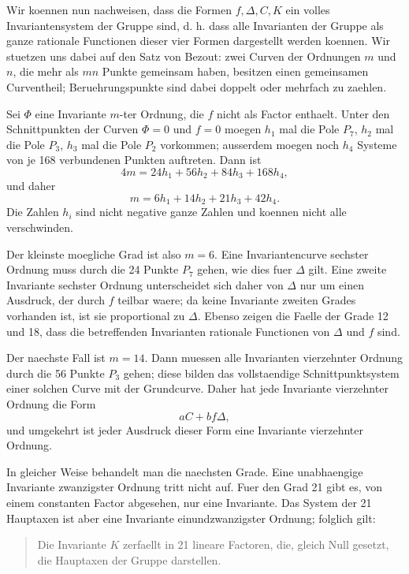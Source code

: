 \documentclass[11pt]{article}
\begin{document}
Wir koennen nun nachweisen, dass die Formen \(f,\Delta,C,K\) ein volles Invariantensystem der Gruppe sind, d. h. dass alle Invarianten der Gruppe als ganze rationale Functionen dieser vier Formen dargestellt werden koennen. Wir stuetzen uns dabei auf den Satz von Bezout: zwei Curven der Ordnungen \(m\) und \(n\), die mehr als \(mn\) Punkte gemeinsam haben, besitzen einen gemeinsamen Curventheil; Beruehrungspunkte sind dabei doppelt oder mehrfach zu zaehlen.

Sei \(\Phi\) eine Invariante \(m\)-ter Ordnung, die \(f\) nicht als Factor enthaelt. Unter den Schnittpunkten der Curven \(\Phi=0\) und \(f=0\) moegen \(h_1\) mal die Pole \(P_7\), \(h_2\) mal die Pole \(P_3\), \(h_3\) mal die Pole \(P_2\) vorkommen; ausserdem moegen noch \(h_4\) Systeme von je 168 verbundenen Punkten auftreten. Dann ist
\begin{equation}
4m=24h_1+56h_2+84h_3+168h_4,
\end{equation}
und daher
\begin{equation}
m=6h_1+14h_2+21h_3+42h_4.
\tag{1}
\end{equation}
Die Zahlen \(h_i\) sind nicht negative ganze Zahlen und koennen nicht alle verschwinden.

Der kleinste moegliche Grad ist also \(m=6\). Eine Invariantencurve sechster Ordnung muss durch die 24 Punkte \(P_7\) gehen, wie dies fuer \(\Delta\) gilt. Eine zweite Invariante sechster Ordnung unterscheidet sich daher von \(\Delta\) nur um einen Ausdruck, der durch \(f\) teilbar waere; da keine Invariante zweiten Grades vorhanden ist, ist sie proportional zu \(\Delta\). Ebenso zeigen die Faelle der Grade 12 und 18, dass die betreffenden Invarianten rationale Functionen von \(\Delta\) und \(f\) sind.

Der naechste Fall ist \(m=14\). Dann muessen alle Invarianten vierzehnter Ordnung durch die 56 Punkte \(P_3\) gehen; diese bilden das vollstaendige Schnittpunktsystem einer solchen Curve mit der Grundcurve. Daher hat jede Invariante vierzehnter Ordnung die Form
\begin{equation}
aC+bf\Delta,
\end{equation}
und umgekehrt ist jeder Ausdruck dieser Form eine Invariante vierzehnter Ordnung.

In gleicher Weise behandelt man die naechsten Grade. Eine unabhaengige Invariante zwanzigster Ordnung tritt nicht auf. Fuer den Grad 21 gibt es, von einem constanten Factor abgesehen, nur eine Invariante. Das System der 21 Hauptaxen ist aber eine Invariante einundzwanzigster Ordnung; folglich gilt:
\begin{quote}
Die Invariante \(K\) zerfaellt in 21 lineare Factoren, die, gleich Null gesetzt, die Hauptaxen der Gruppe darstellen.
\end{quote}
\end{document}

